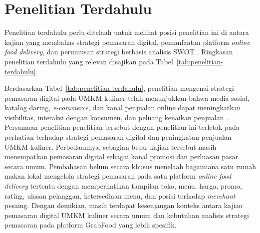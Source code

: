 \section{Penelitian Terdahulu}

Penelitian terdahulu perlu ditelaah untuk melihat posisi penelitian ini di antara kajian yang membahas strategi pemasaran digital, pemanfaatan platform \textit{online food delivery}, dan perumusan strategi berbasis analisis SWOT \parencite{regina2025kuliner,sophia2025rendanggadih,khairani2022buahsayur,haliza2023seqapla}. Ringkasan penelitian terdahulu yang relevan disajikan pada Tabel~\ref{tab:penelitian-terdahulu}.



Berdasarkan Tabel~\ref{tab:penelitian-terdahulu}, penelitian mengenai strategi pemasaran digital pada UMKM kuliner telah menunjukkan bahwa media sosial, katalog daring, \textit{e-commerce}, dan kanal penjualan online dapat meningkatkan visibilitas, interaksi dengan konsumen, dan peluang kenaikan penjualan \parencite{regina2025kuliner,roslam2021markisaaurora,suharjo2020bogorsnacks}. Persamaan penelitian-penelitian tersebut dengan penelitian ini terletak pada perhatian terhadap strategi pemasaran digital dan peningkatan penjualan UMKM kuliner. Perbedaannya, sebagian besar kajian tersebut masih menempatkan pemasaran digital sebagai kanal promosi dan perluasan pasar secara umum. Pembahasan belum secara khusus menelaah bagaimana satu rumah makan lokal mengelola strategi pemasaran pada satu platform \textit{online food delivery} tertentu dengan memperhatikan tampilan toko, menu, harga, promo, rating, ulasan pelanggan, ketersediaan menu, dan posisi terhadap \textit{merchant} pesaing. Dengan demikian, masih terdapat kesenjangan konteks antara kajian pemasaran digital UMKM kuliner secara umum dan kebutuhan analisis strategi pemasaran pada platform GrabFood yang lebih spesifik.

